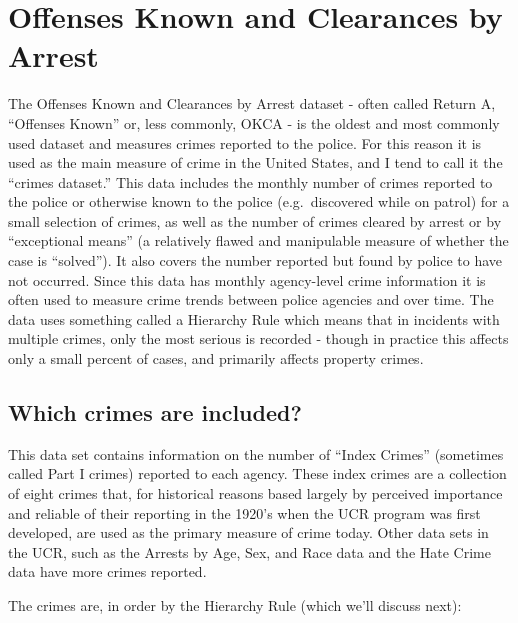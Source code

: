 \documentclass[
  12pt,
  openany]{book}
\begin{document}
\hypertarget{offensesKnown}{%
\chapter{Offenses Known and Clearances by Arrest}\label{offensesKnown}}

The Offenses Known and Clearances by Arrest dataset - often called Return A, ``Offenses Known'' or, less commonly, OKCA - is the oldest and most commonly used dataset and measures crimes reported to the police. For this reason it is used as the main measure of crime in the United States, and I tend to call it the ``crimes dataset.'' This data includes the monthly number of crimes reported to the police or otherwise known to the police (e.g.~discovered while on patrol) for a small selection of crimes, as well as the number of crimes cleared by arrest or by ``exceptional means'' (a relatively flawed and manipulable measure of whether the case is ``solved''). It also covers the number reported but found by police to have not occurred. Since this data has monthly agency-level crime information it is often used to measure crime trends between police agencies and over time. The data uses something called a Hierarchy Rule which means that in incidents with multiple crimes, only the most serious is recorded - though in practice this affects only a small percent of cases, and primarily affects property crimes.

\hypertarget{indexCrimesOffensesKnown}{%
\section{Which crimes are included?}\label{indexCrimesOffensesKnown}}

This data set contains information on the number of ``Index Crimes'' (sometimes called Part I crimes) reported to each agency. These index crimes are a collection of eight crimes that, for historical reasons based largely by perceived importance and reliable of their reporting in the 1920's when the UCR program was first developed, are used as the primary measure of crime today. Other data sets in the UCR, such as the Arrests by Age, Sex, and Race data and the Hate Crime data have more crimes reported.

The crimes are, in order by the Hierarchy Rule (which we'll discuss next):
\end{document}
